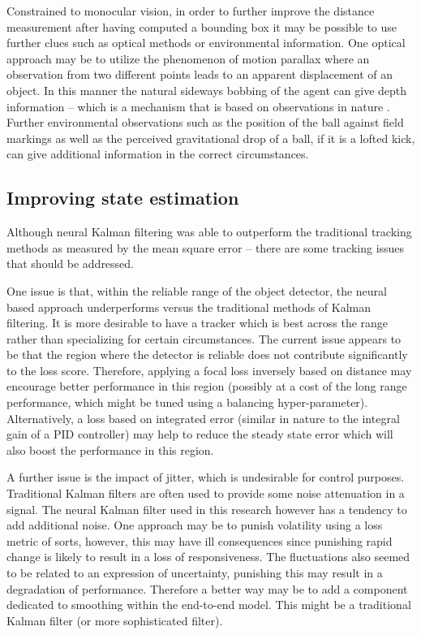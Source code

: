 \documentclass[a4paper,twoside,12pt]{report}
\begin{document}
Constrained to monocular vision, in order to further improve the distance measurement after having computed a bounding box it may be possible to use further clues such as optical methods or environmental information. One optical approach may be to utilize the phenomenon of motion parallax where an observation from two different points leads to an apparent displacement of an object. In this manner the natural sideways bobbing of the agent can give depth information -- which is a mechanism that is based on observations in nature \citep{parrelax}. Further environmental observations such as the position of the ball against field markings as well as the perceived gravitational drop of a ball, if it is a lofted kick, can give additional information in the correct circumstances.

\subsection{Improving state estimation}

Although neural Kalman filtering was able to outperform the traditional tracking methods as measured by the mean square error -- there are some tracking issues that should be addressed. 

One issue is that, within the reliable range of the object detector, the neural based approach underperforms versus the traditional methods of Kalman filtering. It is more desirable to have a tracker which is best across the range rather than specializing for certain circumstances. The current issue appears to be that the region where the detector is reliable does not contribute significantly to the loss score. Therefore, applying a focal loss inversely based on distance may encourage better performance in this region (possibly at a cost of the long range performance, which might be tuned using a balancing hyper-parameter). Alternatively, a loss based on integrated error (similar in nature to the integral gain of a PID controller) may help to reduce the steady state error which will also boost the performance in this region.  

A further issue is the impact of jitter, which is undesirable for control purposes. Traditional Kalman filters are often used to provide some noise attenuation in a signal. The neural Kalman filter used in this research however has a tendency to add additional noise. One approach may be to punish volatility using a loss metric of sorts, however, this may have ill consequences since punishing rapid change is likely to result in a loss of responsiveness. The fluctuations also seemed to be related to an expression of uncertainty, punishing this may result in a degradation of performance. Therefore a better way may be to add a component dedicated to smoothing within the end-to-end model. This might be a traditional Kalman filter (or more sophisticated filter).
\end{document}
